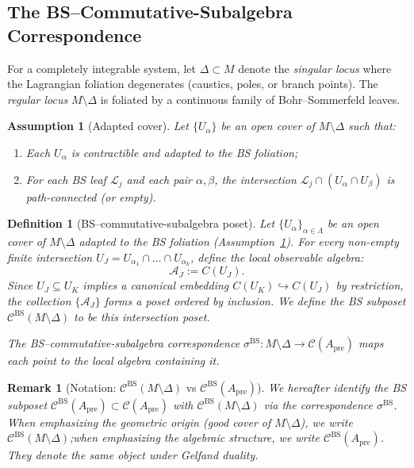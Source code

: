 \documentclass[11pt]{article}
\newtheorem{definition}[theorem]{Definition}
\newtheorem{remark}[theorem]{Remark}
\newtheorem{assumption}[theorem]{Assumption}
\begin{document}
\subsection{The BS--Commutative-Subalgebra Correspondence}

For a completely integrable system, let $\Delta \subset M$ denote the
\emph{singular locus} where the Lagrangian foliation degenerates (caustics,
poles, or branch points). The \emph{regular locus} $M \setminus \Delta$
is foliated by a continuous family of Bohr--Sommerfeld leaves.

\begin{assumption}[Adapted cover]
\label{ass:cover}
Let $\{U_\alpha\}$ be an open cover of $M \setminus \Delta$ such that:
\begin{enumerate}
\item Each $U_\alpha$ is contractible and adapted to the BS foliation;
\item For each BS leaf $\mathcal{L}_j$ and each pair $\alpha, \beta$,
the intersection $\mathcal{L}_j \cap (U_\alpha \cap U_\beta)$ is
path-connected (or empty).
\end{enumerate}
\end{assumption}

\begin{definition}[BS--commutative-subalgebra poset]
\label{def:BS-MASA}
Let $\{U_\alpha\}_{\alpha \in \Lambda}$ be an open cover of $M \setminus \Delta$ adapted to the BS foliation (Assumption~\ref{ass:cover}). For every non-empty finite intersection $U_J = U_{\alpha_1} \cap \dots \cap U_{\alpha_k}$, define the local observable algebra:
\[
  \mathcal{A}_J := C(U_J).
\]
Since $U_J \subseteq U_K$ implies a canonical embedding $C(U_K) \hookrightarrow C(U_J)$ by restriction, the collection $\{\mathcal{A}_J\}$ forms a poset ordered by inclusion. We define the \emph{BS subposet} $\mathcal{C}^{\mathrm{BS}}(M \setminus \Delta)$ to be this intersection poset.

The \emph{BS--commutative-subalgebra correspondence}
$\sigma^{\mathrm{BS}}: M \setminus \Delta \to \mathcal{C}(A_{\mathrm{pre}})$
maps each point to the local algebra containing it.
\end{definition}

\begin{remark}[Notation: $\mathcal{C}^{\mathrm{BS}}(M \setminus \Delta)$ vs $\mathcal{C}^{\mathrm{BS}}(A_{\mathrm{pre}})$]
\label{rem:notation}
We hereafter identify the BS subposet $\mathcal{C}^{\mathrm{BS}}(A_{\mathrm{pre}}) \subset \mathcal{C}(A_{\mathrm{pre}})$
with $\mathcal{C}^{\mathrm{BS}}(M \setminus \Delta)$ via the correspondence $\sigma^{\mathrm{BS}}$.
When emphasizing the geometric origin (good cover of $M \setminus \Delta$), we write
$\mathcal{C}^{\mathrm{BS}}(M \setminus \Delta)$;\linebreak when emphasizing the algebraic structure, we write $\mathcal{C}^{\mathrm{BS}}(A_{\mathrm{pre}})$.
They denote the same object under Gelfand duality.
\end{remark}
\end{document}

